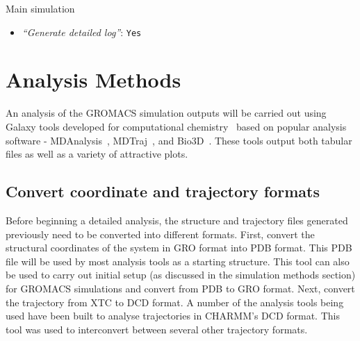 \documentclass[twocolumn]{bmcart}%
\providecommand{\tightlist}{%
  \setlength{\itemsep}{0pt}\setlength{\parskip}{0pt}}
\begin{document}
\begin{handson_box_colour}{Main simulation}
\begin{itemize}
\begin{itemize}
      \begin{itemize}
      \tightlist
      \item
        \emph{``Temperature /K''}: \texttt{300}
      \item
        \emph{``Step length in ps''}: \texttt{0.001}
      \item
        \emph{``Number of steps that elapse between saving data points
        (velocities, forces, energies)''}: \texttt{1000}
      \item
        \emph{``Number of steps for the simulation''}: \texttt{1000000}
      \end{itemize}
    \end{itemize}
  \item
    \emph{``Generate detailed log''}: \texttt{Yes}
  \end{itemize}

\end{handson_box_colour}


\hypertarget{analysis}{%
\section*{Analysis Methods}\label{analysis}}

An analysis of the GROMACS simulation outputs will be carried out using Galaxy tools developed for computational chemistry~\cite{senapathi_biomolecular_2019} based on popular analysis software - MDAnalysis~\cite{michaudagrawal_mdanalysis_2011}, MDTraj~\cite{mcgibbon_mdtraj_2015}, and  Bio3D~\cite{skjaerven_integrating_2014}. These tools output both tabular files as well as a variety of attractive plots.



\hypertarget{create-pdb-file-needed-by-most-analysis-tools}{%
\subsection*{Convert coordinate and trajectory formats}\label{create-pdb-file-needed-by-most-analysis-tools}}

Before beginning a detailed analysis, the structure and trajectory files generated previously need to be converted into different formats. First, convert the structural coordinates of the system in GRO format into PDB format. This PDB file will be used by most analysis tools as a starting structure. This tool can also be used to carry out initial setup (as discussed in the simulation methods section) for GROMACS simulations and convert from PDB to GRO format. Next, convert the trajectory from XTC to DCD format. A number of the analysis tools being used have been built to analyse trajectories in CHARMM's DCD format. This tool was used to interconvert between several other trajectory formats. 
\end{document}
